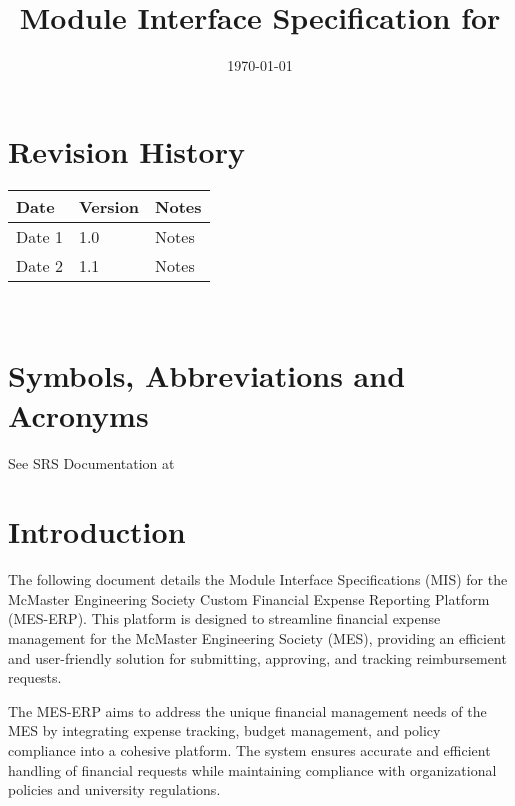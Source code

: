 \documentclass[12pt, titlepage]{article}
\begin{document}
\title{Module Interface Specification for \progname{}}

\author{\authname}

\date{\today}

\maketitle


\section{Revision History}

\begin{tabularx}{\textwidth}{p{3cm}p{2cm}X}
\toprule {\bf Date} & {\bf Version} & {\bf Notes}\\
\midrule
Date 1 & 1.0 & Notes\\
Date 2 & 1.1 & Notes\\
\bottomrule
\end{tabularx}

~\newpage

\section{Symbols, Abbreviations and Acronyms}

See SRS Documentation at 


\newpage

\tableofcontents

\newpage


\section{Introduction}

The following document details the Module Interface Specifications (MIS) for the McMaster Engineering Society Custom Financial Expense Reporting Platform (MES-ERP). This platform is designed to streamline financial expense management for the McMaster Engineering Society (MES), providing an efficient and user-friendly solution for submitting, approving, and tracking reimbursement requests.

The MES-ERP aims to address the unique financial management needs of the MES by integrating expense tracking, budget management, and policy compliance into a cohesive platform. The system ensures accurate and efficient handling of financial requests while maintaining compliance with organizational policies and university regulations.
\end{document}

